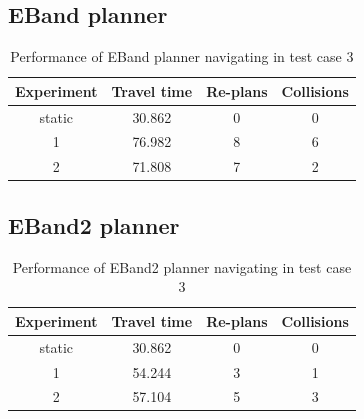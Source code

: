\subsection{EBand planner}%
\label{sub:eval_eband_planner_tc3}

\begin{table}[H]
    \centering
    \begin{tabular}{cccc}
        \textbf{Experiment} & \textbf{Travel time} & \textbf{Re-plans} & \textbf{Collisions} \\\toprule
        static & 30.862 & 0 & 0 \\
             1 & 76.982 & 8 & 6 \\
             2 & 71.808 & 7 & 2 \\
    \end{tabular}
    \caption{Performance of EBand planner navigating in test case 3}\label{tab:perfomance_eband_test_case_3}
\end{table}


\subsection{EBand2 planner}%
\label{sub:eval_eband2_planner_tc3}

\begin{table}[htpb]
    \centering
    \begin{tabular}{cccc}
        \textbf{Experiment} & \textbf{Travel time} & \textbf{Re-plans} & \textbf{Collisions} \\\toprule
        static & 30.862 & 0 & 0 \\
             1 & 54.244 & 3 & 1 \\
             2 & 57.104 & 5 & 3 \\
    \end{tabular}
    \caption{Performance of EBand2 planner navigating in test case 3}\label{tab:perfomance_eband2_test_case_3}
\end{table}

